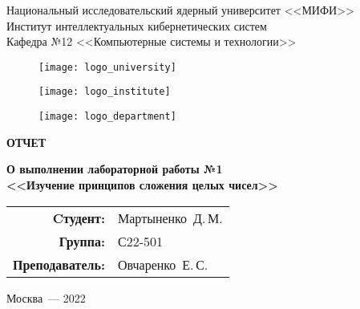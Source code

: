 \begin{titlepage}
  \begin{center}
    \begin{large}
      Национальный исследовательский ядерный университет <<МИФИ>> \\
      \vspace{0.25cm}
      Институт интеллектуальных кибернетических систем \\
      \vspace{0.25cm}
      Кафедра №12 <<Компьютерные системы и технологии>>
    \end{large}

    \vspace*{1cm}

    \begin{figure}[H]
      \centering
      \begin{minipage}[c]{0.3\textwidth}
        \texttt{[image: logo\_university]}
      \end{minipage}
      \hfill
      \begin{minipage}[c]{0.3\textwidth}
        \texttt{[image: logo\_institute]}
      \end{minipage}
      \hfill
      \begin{minipage}[c]{0.3\textwidth}
        \texttt{[image: logo\_department]}
      \end{minipage}
    \end{figure}

    \vspace{4cm}

    \begin{huge}
      \textbf{ОТЧЕТ}
    \end{huge}

    \begin{large}
      \textbf{О выполнении лабораторной работы №1 \\
        <<Изучение принципов сложения целых чисел>>}
    \end{large}
    
    \vfill
    
    \begin{flushright}
      \begin{tabular}{ r l }
        \textbf{Cтудент:} & Мартыненко~Д.\,М. \\ 
        \textbf{Группа:} & С22-501 \\  
        \textbf{Преподаватель:} & Овчаренко~Е.\,С. \\
      \end{tabular}
    \end{flushright}
            
    Москва~--- 2022
  \end{center}
\end{titlepage}
